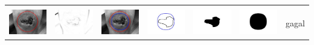 \begin{table}[H]
\begin{tabular}{|m{0.7in}|m{0.7in}|m{0.7in}|m{0.7in}|m{0.7in}|m{0.7in}|m{0.7in}|}
		&  &  & & & &  \\
		\includegraphics[width=0.7in]{dataset/dataset_3/luka_merah/ready/29_integer_init.jpg}&
		\includegraphics[width=0.7in]{dataset/dataset_3/luka_merah/ready/29_integer_ext.jpg}&
		\includegraphics[width=0.7in]{dataset/dataset_3/luka_merah/ready/29_integer_result.jpg}&
		\includegraphics[width=0.7in]{dataset/dataset_3/luka_merah/ready/29_gt_r_integer.jpg}&
		\includegraphics[width=0.7in]{dataset/dataset_3/luka_merah/ready/29_r.jpg}&
		\includegraphics[width=0.7in]{dataset/dataset_3/luka_merah/ready/29_integer_r.jpg}&
		gagal\\
		\hline
		

\end{tabular}
\end{table}
